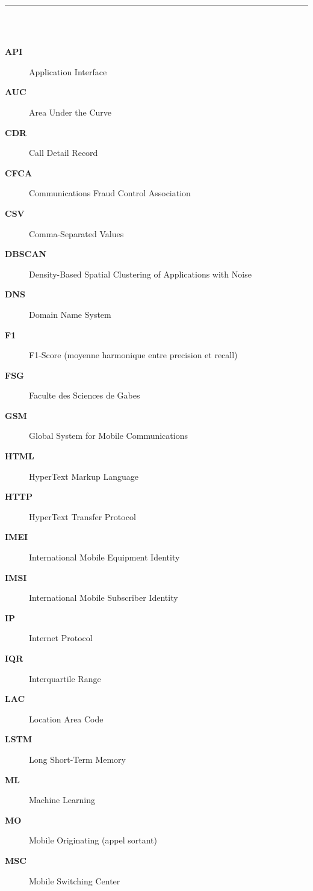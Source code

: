 \documentclass[12pt, oneside, a4paper]{report}
\begin{document}
\clearpage
\thispagestyle{plain}

\noindent\rule[-0.2cm]{0.45cm}{1.2cm}\hspace{0.15cm}%
\raisebox{0.85cm}{\rule{0.85\textwidth}{0.5pt}}\\[0.3cm]
\noindent{}\\
\begin{description}
\item[\textbf{API}] Application Interface
\item[\textbf{AUC}] Area Under the Curve
\item[\textbf{CDR}] Call Detail Record
\item[\textbf{CFCA}] Communications Fraud Control Association
\item[\textbf{CSV}] Comma-Separated Values
\item[\textbf{DBSCAN}] Density-Based Spatial Clustering of Applications with Noise
\item[\textbf{DNS}] Domain Name System
\item[\textbf{F1}] F1-Score (moyenne harmonique entre precision et recall)
\item[\textbf{FSG}] Faculte des Sciences de Gabes
\item[\textbf{GSM}] Global System for Mobile Communications
\item[\textbf{HTML}] HyperText Markup Language
\item[\textbf{HTTP}] HyperText Transfer Protocol
\item[\textbf{IMEI}] International Mobile Equipment Identity
\item[\textbf{IMSI}] International Mobile Subscriber Identity
\item[\textbf{IP}] Internet Protocol
\item[\textbf{IQR}] Interquartile Range
\item[\textbf{LAC}] Location Area Code
\item[\textbf{LSTM}] Long Short-Term Memory
\item[\textbf{ML}] Machine Learning
\item[\textbf{MO}] Mobile Originating (appel sortant)
\item[\textbf{MSC}] Mobile Switching Center

\end{description}
\end{document}
